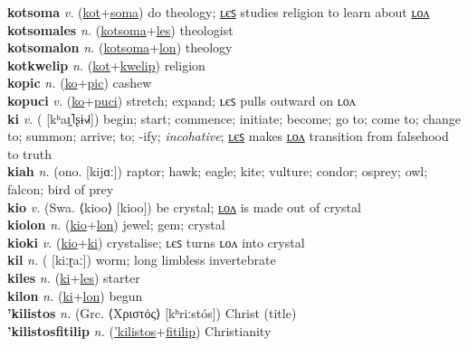 \textbf{kotsoma} \textit{v.} (\hyperref[kot]{kot}+\hyperref[soma]{soma})
do theology; \hyperref[kotsomales]{ʟєꜱ} studies religion to learn about \hyperref[kotsomalon]{ʟᴏᴧ} \label{kotsoma} \\
\textbf{kotsomales} \textit{n.} (\hyperref[kotsoma]{kotsoma}+\hyperref[les]{les})
theologist \label{kotsomales} \\
\textbf{kotsomalon} \textit{n.} (\hyperref[kotsoma]{kotsoma}+\hyperref[lon]{lon})
theology \label{kotsomalon} \\
\textbf{kotkwelip} \textit{n.} (\hyperref[kot]{kot}+\hyperref[kwelip]{kwelip})
religion \label{kotkwelip} \\
\textbf{kopic} \textit{n.} (\hyperref[ko]{ko}+\hyperref[pic]{pic})
cashew \label{kopic} \\
\textbf{kopuci} \textit{v.} (\hyperref[ko]{ko}+\hyperref[puci]{puci})
stretch; expand; ʟєꜱ pulls outward on ʟᴏᴧ \label{kopuci} \\
\textbf{ki} \textit{v.} ( [kʰaɪ̯˥ʂɨ˧˩˧])
begin; start; commence; initiate; become; go to; come to; change to; summon; arrive; to; -ify; \textit{incohative}; \hyperref[kiles]{ʟєꜱ} makes \hyperref[kilon]{ʟᴏᴧ} transition from falsehood to truth \label{ki} \\
\textbf{kiah} \textit{n.} (ono. [kijɑː])
raptor; hawk; eagle; kite; vulture; condor; osprey; owl; falcon; bird of prey \label{kiah} \\
\textbf{kio} \textit{v.} (Swa. ⟨kioo⟩ [kioo])
be crystal; \hyperref[kiolon]{ʟᴏᴧ} is made out of crystal \label{kio} \\
\textbf{kiolon} \textit{n.} (\hyperref[kio]{kio}+\hyperref[lon]{lon})
jewel; gem; crystal \label{kiolon} \\
\textbf{kioki} \textit{v.} (\hyperref[kio]{kio}+\hyperref[ki]{ki})
crystalise; ʟєꜱ turns ʟᴏᴧ into crystal \label{kioki} \\
\textbf{kil} \textit{n.} ( [kiːɽaː])
worm; long limbless invertebrate \label{kil} \\
\textbf{kiles} \textit{n.} (\hyperref[ki]{ki}+\hyperref[les]{les})
starter \label{kiles} \\
\textbf{kilon} \textit{n.} (\hyperref[ki]{ki}+\hyperref[lon]{lon})
begun \label{kilon} \\
\textbf{'kilistos} \textit{n.} (Grc. ⟨Χριστός⟩ [kʰriːstós])
Christ (title) \label{'kilistos} \\
\textbf{'kilistosfitilip} \textit{n.} (\hyperref['kilistos]{'kilistos}+\hyperref[fitilip]{fitilip})
Christianity \label{'kilistosfitilip} \\
